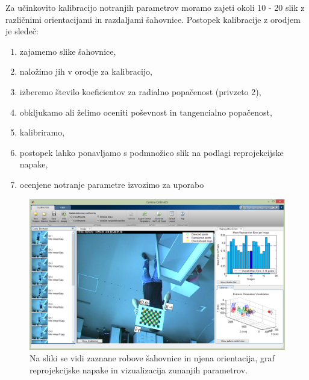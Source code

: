 \documentclass[a4paper, 12pt]{book}
\begin{document}
Za učinkovito kalibracijo notranjih parametrov moramo zajeti okoli 10 - 20 slik z različnimi orientacijami in razdaljami šahovnice. Postopek kalibracije z orodjem je sledeč:
\begin{enumerate}
\itemsep0em
\item zajamemo slike šahovnice,
\item naložimo jih v orodje za kalibracijo,
\item izberemo število koeficientov za radialno popačenost (privzeto 2),
\item obkljukamo ali želimo oceniti poševnost in tangencialno popačenost,
\item kalibriramo,
\item postopek lahko ponavljamo s podmnožico slik na podlagi reprojekcijske napake,
\item ocenjene notranje parametre izvozimo za uporabo

\end{enumerate}
\begin{figure}[H]
\centering
\includegraphics[width=\textwidth,height=\textheight,keepaspectratio]{internal_calibration.png}
\caption{Na sliki se vidi zaznane robove šahovnice in njena orientacija, graf reprojekcijske napake in vizualizacija zunanjih parametrov.}
\end{figure}
\end{document}
